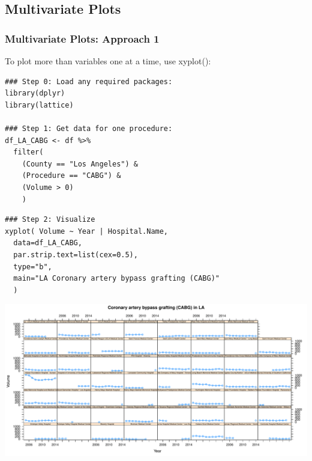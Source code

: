 

\subsection{Multivariate Plots}


\begin{frame}
 \frametitle{Multivariate Plots: Approach 1}

To plot more than variables one at a time, use \ttfamily xyplot()\normalfont [5]:
		\begin{lstlisting}
### Step 0: Load any required packages:
library(dplyr)
library(lattice)

### Step 1: Get data for one procedure:
df_LA_CABG <- df %>%
  filter( 
    (County == "Los Angeles") & 
    (Procedure == "CABG") & 
    (Volume > 0) 
    )
    \end{lstlisting}

\newpage    
    \begin{lstlisting}
### Step 2: Visualize    
xyplot( Volume ~ Year | Hospital.Name, 
  data=df_LA_CABG,
  par.strip.text=list(cex=0.5),
  type="b",
  main="LA Coronary artery bypass grafting (CABG)"
  )
		\end{lstlisting}

\newpage
      \vspace{-20pt} \hspace{-20pt}
         \includegraphics[width=1.05\textwidth]{images/timeseries_LA_CABG}

\end{frame}


